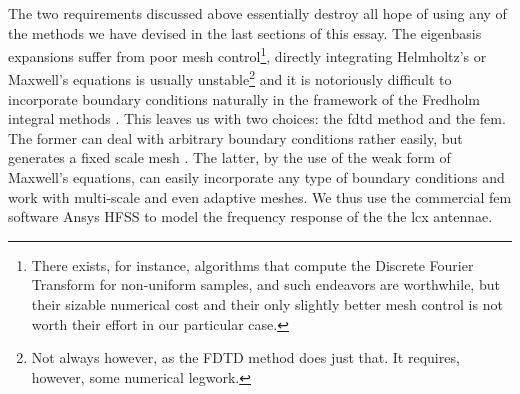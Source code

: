 The two requirements discussed above essentially destroy all hope of using any
of the methods we have devised in the last sections of this essay. The eigenbasis
expansions suffer from poor mesh control\footnote{There exists, for instance, 
algorithms that compute the Discrete Fourier Transform for non-uniform
samples, and such endeavors are worthwhile, but their sizable numerical
cost and their only slightly better mesh control is not worth their effort in 
our particular case.}, directly integrating Helmholtz's or Maxwell's equations
is usually unstable\footnote{Not always however, as the FDTD method does just that.
It requires, however, some numerical legwork.} and it is notoriously difficult
to incorporate boundary conditions naturally in the framework of the Fredholm 
integral methods \cite{MAR2003}. This leaves us with two choices: the \gls{fdtd}
method and the \gls{fem}. The former can deal with arbitrary boundary conditions
rather easily, but generates a fixed scale mesh \cite{OSK2010}. The latter, by the use of the weak
form of Maxwell's equations, can easily incorporate any type of boundary conditions
and work with multi-scale and even adaptive meshes. We thus use the commercial \gls{fem}
software Ansys HFSS to model the frequency response of the the \gls{lcx} antennae.

